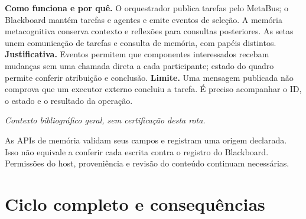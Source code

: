 \begin{descricao}
\textbf{Como funciona e por quê.} O orquestrador publica tarefas pelo MetaBus; o Blackboard mantém tarefas e agentes e emite eventos de seleção. A memória metacognitiva conserva contexto e reflexões para consultas posteriores. As setas unem comunicação de tarefas e consulta de memória, com papéis distintos.
\textbf{Justificativa.} Eventos permitem que componentes interessados recebam mudanças sem uma chamada direta a cada participante; estado do quadro permite conferir atribuição e conclusão.
\textbf{Limite.} Uma mensagem publicada não comprova que um executor externo concluiu a tarefa. É preciso acompanhar o ID, o estado e o resultado da operação.
\end{descricao}


\noindent\textit{Contexto bibliográfico geral, sem certificação desta rota.} 


\begin{limite}
As APIs de memória validam seus campos e registram uma origem declarada.
Isso não equivale a conferir cada escrita contra o registro do Blackboard.
Permissões do host, proveniência e revisão do conteúdo continuam necessárias.
\end{limite}

\clearpage
\section{Ciclo completo e consequências}



